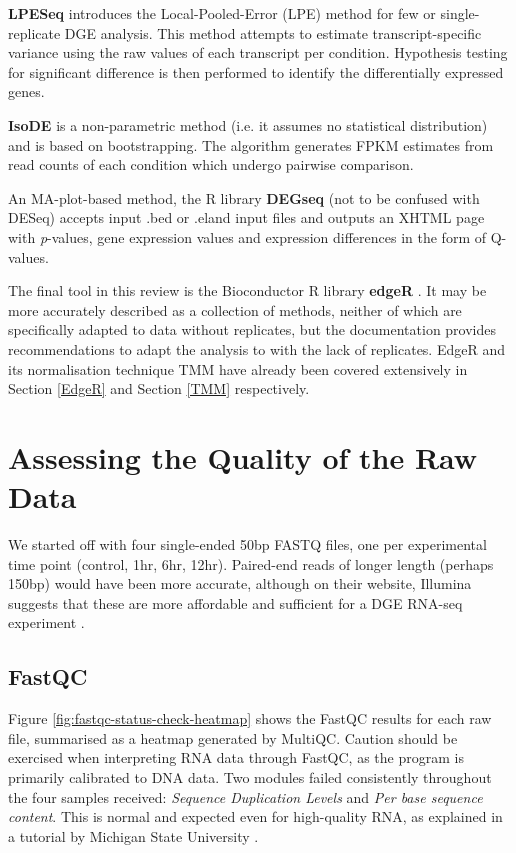 \textbf{LPESeq} \citep{gim2016lpeseq} introduces the Local-Pooled-Error (LPE) method for few or single-replicate \ac{DGE} analysis. This method attempts to estimate transcript-specific variance using the raw values of each transcript per condition. Hypothesis testing for significant difference is then performed to identify the differentially expressed genes.

\textbf{IsoDE} \citep{al2014bootstrap} is a non-parametric method (i.e. it assumes no statistical distribution) and is based on bootstrapping. The algorithm generates FPKM estimates from read counts of each condition which undergo pairwise comparison.

An MA-plot-based method, the R library \textbf{DEGseq} \citep{wang2010degseq} (not to be confused with DESeq) accepts input .bed or .eland input files and outputs an XHTML page with \textit{p}-values, gene expression values and expression differences in the form of Q-values.

The final tool in this review is the Bioconductor R library \textbf{edgeR} \citep{edger}. It may be more accurately described as a collection of methods, neither of which are specifically adapted to data without replicates, but the documentation provides recommendations to adapt the analysis to with the lack of replicates. EdgeR and its normalisation technique TMM have already been covered extensively in Section \ref{EdgeR} and Section \ref{TMM} respectively. 






\section{Assessing the Quality of the Raw Data}
\label{Assessing the Quality of the Raw Data}
We started off with four single-ended 50bp FASTQ files, one per experimental time point (control, 1hr, 6hr, 12hr). Paired-end reads of longer length (perhaps 150bp) would have been more accurate, although on their website, Illumina suggests that these are more affordable and sufficient for a \ac{DGE} RNA-seq experiment \citep{illumina2022reads}.



\subsection{FastQC}
Figure \ref{fig:fastqc-status-check-heatmap} shows the FastQC results for each raw file, summarised as a heatmap generated by MultiQC. Caution should be exercised when interpreting RNA data through FastQC, as the program is primarily calibrated to DNA data. Two modules failed consistently throughout the four samples received: \textit{Sequence Duplication Levels} and \textit{Per base sequence content}.
This is normal and expected even for high-quality RNA, as explained in a tutorial by Michigan State University \citep{fastqctutorial2021}.


